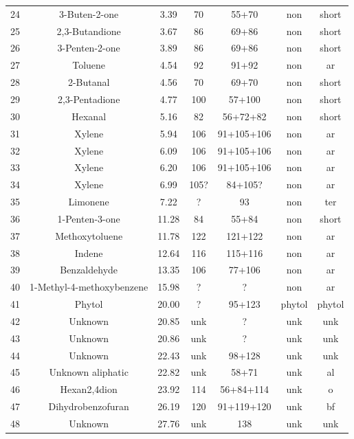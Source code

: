 \documentclass[preprint,review,12pt]{elsarticle}
\begin{document}
\begin{table}[h!]
\begin{center}
{\begin{tabular}{ccccccc}
  24 & 3-Buten-2-one & 3.39 & 70 & 55+70 & non & short \\ 
  25 & 2,3-Butandione & 3.67 & 86 & 69+86 & non & short \\ 
  26 & 3-Penten-2-one & 3.89 & 86 & 69+86 & non & short \\ 
  27 & Toluene & 4.54 & 92 & 91+92 & non & ar \\ 
  28 & 2-Butanal & 4.56 & 70 & 69+70 & non & short \\ 
  29 & 2,3-Pentadione & 4.77 & 100 & 57+100 & non & short \\ 
  30 & Hexanal & 5.16 & 82 & 56+72+82 & non & short \\ 
  31 & Xylene & 5.94 & 106 & 91+105+106 & non & ar \\ 
  32 & Xylene & 6.09 & 106 & 91+105+106 & non & ar \\ 
  33 & Xylene & 6.20 & 106 & 91+105+106 & non & ar \\ 
  34 & Xylene & 6.99 & 105? & 84+105? & non & ar \\ 
  35 & Limonene & 7.22 & ? & 93 & non & ter \\ 
  36 & 1-Penten-3-one & 11.28 & 84 & 55+84 & non & short \\ 
  37 & Methoxytoluene & 11.78 & 122 & 121+122 & non & ar \\ 
  38 & Indene & 12.64 & 116 & 115+116 & non & ar \\ 
  39 & Benzaldehyde & 13.35 & 106 & 77+106 & non & ar \\ 
  40 & 1-Methyl-4-methoxybenzene & 15.98 & ? & ? & non & ar \\ 
  41 & Phytol & 20.00 & ? & 95+123 & phytol & phytol \\ 
  42 & Unknown & 20.85 & unk & ? & unk & unk \\ 
  43 & Unknown & 20.86 & unk & ? & unk & unk \\ 
  44 & Unknown & 22.43 & unk & 98+128 & unk & unk \\ 
  45 & Unknown aliphatic & 22.82 & unk & 58+71 & unk & al \\ 
  46 & Hexan2,4dion & 23.92 & 114 & 56+84+114 & unk & o \\ 
  47 & Dihydrobenzofuran & 26.19 & 120 & 91+119+120 & unk & bf \\ 
  48 & Unknown & 27.76 & unk & 138 & unk & unk \\ 
   \hline
\end{tabular}
}
\end{center}
\end{table}
\end{document}
